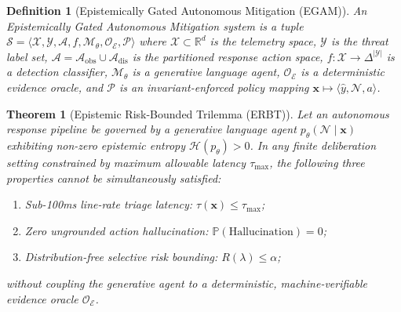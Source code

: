 \documentclass{ieeeaccess}
\newtheorem{theorem}{Theorem}
\newtheorem{definition}{Definition}
\begin{document}
\begin{definition}[Epistemically Gated Autonomous Mitigation (EGAM)]
An Epistemically Gated Autonomous Mitigation system is a tuple $\mathcal{S} = \langle \mathcal{X}, \mathcal{Y}, \mathcal{A}, f, \mathcal{M}_{\theta}, \mathcal{O}_{\mathcal{E}}, \mathcal{P} \rangle$ where $\mathcal{X} \subset \mathbb{R}^d$ is the telemetry space, $\mathcal{Y}$ is the threat label set, $\mathcal{A} = \mathcal{A}_{\text{obs}} \cup \mathcal{A}_{\text{dis}}$ is the partitioned response action space, $f: \mathcal{X} \to \Delta^{|\mathcal{Y}|}$ is a detection classifier, $\mathcal{M}_{\theta}$ is a generative language agent, $\mathcal{O}_{\mathcal{E}}$ is a deterministic evidence oracle, and $\mathcal{P}$ is an invariant-enforced policy mapping $\mathbf{x} \mapsto \langle \hat{y}, \mathcal{N}, a \rangle$.
\end{definition}

\begin{theorem}[Epistemic Risk-Bounded Trilemma (ERBT)]
\label{thm:erbt}
Let an autonomous response pipeline be governed by a generative language agent $p_{\theta}(\mathcal{N} \mid \mathbf{x})$ exhibiting non-zero epistemic entropy $\mathcal{H}(p_\theta) > 0$. In any finite deliberation setting constrained by maximum allowable latency $\tau_{\max}$, the following three properties cannot be simultaneously satisfied:
\begin{enumerate}
    \item Sub-100ms line-rate triage latency: $\tau(\mathbf{x}) \le \tau_{\max}$;
    \item Zero ungrounded action hallucination: $\mathbb{P}(\text{Hallucination}) = 0$;
    \item Distribution-free selective risk bounding: $R(\lambda) \le \alpha$;
\end{enumerate}
without coupling the generative agent to a deterministic, machine-verifiable evidence oracle $\mathcal{O}_{\mathcal{E}}$.
\end{theorem}
\end{document}
